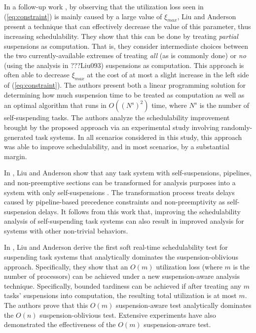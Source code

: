 In a follow-up work \cite{Liu5}, by observing that the utilization loss seen in (\ref{eq:constraint}) is mainly caused by a large value of $\xi_{max}$, Liu and Anderson present a technique that can effectively decrease the value of this parameter, thus increasing schedulability. They show that this can be done by treating \textit{partial} suspensions as computation. That is, they consider intermediate choices between the two currently-available extremes of treating \textit{all} (as is commonly done) or \textit{no} (using the analysis in ???Liu093) suspensions as computation. This approach is often able to decrease $\xi_{max}$ at the cost of at most a slight increase in the left side of (\ref{eq:constraint}). The authors present both a linear programming solution for determining how much suspension time to be treated as computation as well as an optimal algorithm that runs in $O((N^s)^2)$ time, where $N^s$ is the number of self-suspending tasks. The authors analyze the schedulability improvement brought by the proposed approach via an experimental study involving randomly-generated task systems. In all scenarios considered in this study, this approach was able to improve schedulability, and in most scenarios, by a substantial margin. 

In \cite{Liu4}, Liu and Anderson  show that any task system with self-suspensions, pipelines, and
non-preemptive sections can be transformed for analysis purposes into a system with only self-suspensions \cite{Liu4}. The transformation process treats delays caused by pipeline-based precedence constraints and non-preemptivity as self-suspension delays. It follows from this work that, improving the schedulability analysis of self-suspending task systems can also result in improved analysis for systems with other non-trivial behaviors.

In \cite{Liu9,Liu11}, Liu and Anderson derive the first soft real-time schedulability test for suspending task systems that analytically dominates the suspension-oblivious approach. Specifically, they show that an $O(m)$ utilization loss (where $m$ is the number of processors) can be achieved under a new suspension-aware analysis technique. Specifically, bounded tardiness can be achieved if after treating any $m$ tasks' suspensions into computation, the resulting total utilization is at most $m$. The authors prove that this $O(m)$ suspension-aware test analytically dominates the $O(n)$ suspension-oblivious test. Extensive experiments have also demonstrated the effectiveness of the $O(m)$ suspension-aware test.
